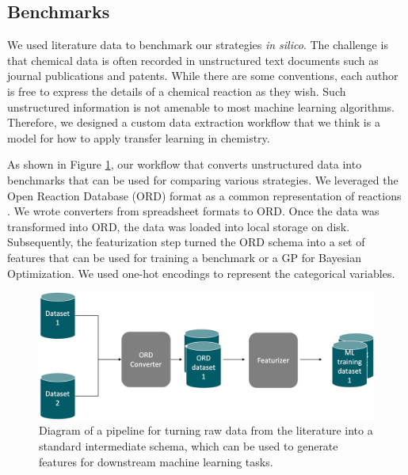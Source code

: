 \subsection{Benchmarks}

We used literature data to benchmark our strategies \textit{in silico}. The challenge is that chemical data is often recorded in unstructured text documents such as journal publications and patents. While there are some conventions, each author is free to express the details of a chemical reaction as they wish. Such unstructured information is not amenable to most machine learning algorithms. Therefore, we designed a custom data extraction workflow that we think is a model for how to apply transfer learning in chemistry.

As shown in Figure \ref{fig:ord_pipeline}, our workflow that converts unstructured data into benchmarks that can be used for comparing various strategies.  We leveraged the Open Reaction Database (ORD) format as a common representation of reactions \cite{Kearnes2021}. We wrote converters from spreadsheet formats to ORD. Once the data was transformed into ORD, the data was loaded into local storage on disk. Subsequently, the featurization step turned the ORD schema into a set of features that can be used for training a benchmark or a GP for Bayesian Optimization.  We used one-hot encodings to represent the categorical variables. 

\begin{figure}[t]
    \centering
    \includegraphics[width=\textwidth]{gfx/Chapter04/etl_pipeline.png}
    \caption{Diagram of a pipeline for turning raw data from the literature into a standard intermediate schema, which can be used to generate features for downstream machine learning tasks.}
    \label{fig:ord_pipeline}
\end{figure}

